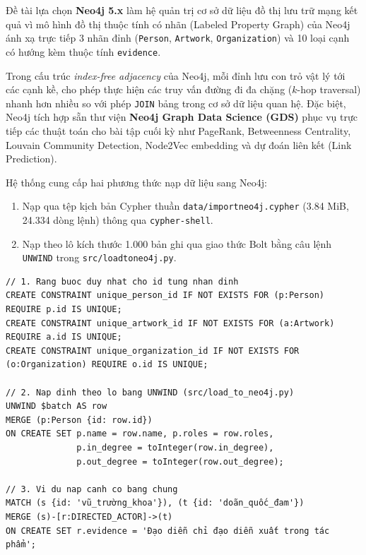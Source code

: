\documentclass[12pt,a4paper]{article}
\renewcommand{\_}{\oldunderscore\hspace{0pt}}
\begin{document}
Đề tài lựa chọn \textbf{Neo4j 5.x} làm hệ quản trị cơ sở dữ liệu đồ thị lưu trữ mạng kết quả vì mô hình đồ thị thuộc tính có nhãn (Labeled Property Graph) của Neo4j ánh xạ trực tiếp 3 nhãn đỉnh (\texttt{Person}, \texttt{Artwork}, \texttt{Organization}) và 10 loại cạnh có hướng kèm thuộc tính \texttt{evidence}.

Trong cấu trúc \textit{index-free adjacency} của Neo4j, mỗi đỉnh lưu con trỏ vật lý tới các cạnh kề, cho phép thực hiện các truy vấn đường đi đa chặng ($k$-hop traversal) nhanh hơn nhiều so với phép \texttt{JOIN} bảng trong cơ sở dữ liệu quan hệ. Đặc biệt, Neo4j tích hợp sẵn thư viện \textbf{Neo4j Graph Data Science (GDS)} phục vụ trực tiếp các thuật toán cho bài tập cuối kỳ như PageRank, Betweenness Centrality, Louvain Community Detection, Node2Vec embedding và dự đoán liên kết (Link Prediction).

Hệ thống cung cấp hai phương thức nạp dữ liệu sang Neo4j:
\begin{enumerate}
  \item Nạp qua tệp kịch bản Cypher thuần \texttt{data/\allowbreak import\_neo4j.cypher} (3.84 MiB, 24.334 dòng lệnh) thông qua \texttt{cypher-shell}.
  \item Nạp theo lô kích thước 1.000 bản ghi qua giao thức Bolt bằng câu lệnh \texttt{UNWIND} trong \texttt{src/\allowbreak load\_to\_neo4j.py}.
\end{enumerate}

\begin{lstlisting}[caption={Trích đoạn kịch bản Cypher tạo ràng buộc và nạp nút/cạnh mẫu},label={lst:cypher-sample}]
// 1. Rang buoc duy nhat cho id tung nhan dinh
CREATE CONSTRAINT unique_person_id IF NOT EXISTS FOR (p:Person) REQUIRE p.id IS UNIQUE;
CREATE CONSTRAINT unique_artwork_id IF NOT EXISTS FOR (a:Artwork) REQUIRE a.id IS UNIQUE;
CREATE CONSTRAINT unique_organization_id IF NOT EXISTS FOR (o:Organization) REQUIRE o.id IS UNIQUE;

// 2. Nap dinh theo lo bang UNWIND (src/load_to_neo4j.py)
UNWIND $batch AS row
MERGE (p:Person {id: row.id})
ON CREATE SET p.name = row.name, p.roles = row.roles,
              p.in_degree = toInteger(row.in_degree),
              p.out_degree = toInteger(row.out_degree);

// 3. Vi du nap canh co bang chung
MATCH (s {id: 'vũ_trường_khoa'}), (t {id: 'doãn_quốc_đam'})
MERGE (s)-[r:DIRECTED_ACTOR]->(t)
ON CREATE SET r.evidence = 'Đạo diễn chỉ đạo diễn xuất trong tác phẩm';
\end{lstlisting}
\end{document}
